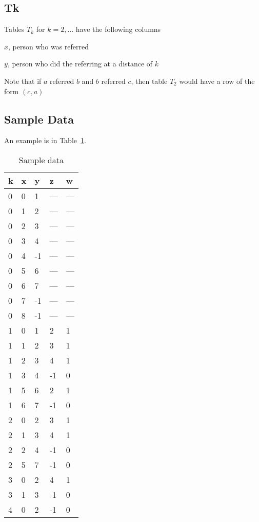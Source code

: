 \subsection{Tk}

Tables \(T_k\) for \(k =  2, \ldots\) have the following columns
\be
\item \(x\), person who was referred
\item \(y\), person who did the referring at a distance of \(k\)
\ee

Note that if \(a\) referred \(b\) and \(b\) referred \(c\), then table \(T_2\)
would have a row of the form \((c, a)\)

\subsection{Sample Data}
An example is in Table~\ref{example_extend}. 
\begin{table}[hp]
\centering
\begin{tabular} {|l|l|l|l|l|} \\ \hline \hline
{\bf k} & {\bf x} & {\bf y} & {\bf z} & {\bf w} \\ \hline
0 & 0 & 1  & --- & --- \\ \hline
0 & 1 & 2  & --- & --- \\ \hline
0 & 2 & 3  & --- & --- \\ \hline
0 & 3 & 4  & --- & --- \\ \hline
0 & 4 & -1 & --- & --- \\\hline
0 & 5 & 6  &  --- & --- \\\hline
0 & 6 & 7  &  --- & --- \\\hline
0 & 7 & -1 &  --- & --- \\\hline
0 & 8 & -1 &  --- & --- \\\hline
\hline  \hline
1 & 0 & 1  & 2  & 1 \\ \hline
1 & 1 & 2  & 3  & 1 \\ \hline
1 & 2 & 3  & 4  & 1 \\ \hline
1 & 3 & 4  & -1 & 0 \\ \hline
1 & 5 & 6  & 2  & 1 \\ \hline
1 & 6 & 7  & -1 & 0 \\ \hline
\hline  \hline
2 & 0 & 2 & 3 & 1 \\ \hline
2 & 1 & 3 & 4 & 1 \\ \hline
2 & 2 & 4 & -1 & 0 \\ \hline
2 & 5 & 7 & -1 & 0 \\ \hline
\hline  \hline
3 & 0 & 2 & 4 & 1 \\ \hline
3 & 1 & 3 & -1 & 0 \\ \hline
\hline  \hline
4 & 0 & 2 & -1 & 0 \\ \hline
\end{tabular}
\caption{Sample data}
\label{example_extend}
\end{table}


